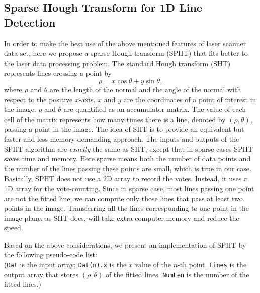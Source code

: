 \documentclass[twocolumn]{IEEEtran}
\begin{document}
\subsection{Sparse Hough Transform for 1D Line Detection}
\label{sec22}

In order to make the best use of the above mentioned features of laser scanner data set, here we propose a sparse Hough transform (SPHT) that fits better to the laser data processing problem. The standard Hough transform (SHT) represents lines crossing a point by 
$$ \rho = x \cos\theta + y \sin\theta, $$
where $\rho$ and $\theta$ are the length of the normal and the angle of the normal with respect to the positive $x$-axis. $x$ and $y$ are the coordinates of a point of interest in the image.   $\rho$ and $\theta$ are quantified as an accumulator matrix. The value of each cell of the matrix represents how many times there is a line, denoted by $(\rho, \theta)$, passing a point in the image. The idea of SHT is to provide an equivalent but faster and less memory-demanding approach. %
The inputs and outputs of the SPHT algorithm are {\em exactly} the same as SHT, except that in sparse cases SPHT saves time and memory. Here sparse means both the number of data points and the number of the lines passing these points are small, which is true in our case. Basically, SPHT does not use a 2D array to record the votes. Instead, it uses a 1D  array for the  vote-counting. Since in sparse case, most lines passing one point are not the fitted line, we can compute only those lines that pass at least two points in the image. Transferring all the lines corresponding to one point in the image plane, as SHT does, will take extra computer memory and reduce the speed. 


Based on the above considerations, we present an 
 implementation of SPHT by the following   pseudo-code list:\\
(\texttt{Dat} is the input array; \texttt{Dat(n).x} is the $x$ value of the $n$-th point. 
\texttt{Lines} is the output array that stores $(\rho,\theta)$ of the fitted lines.
\texttt{NumLen} is the number of the fitted lines.)
\end{document}
